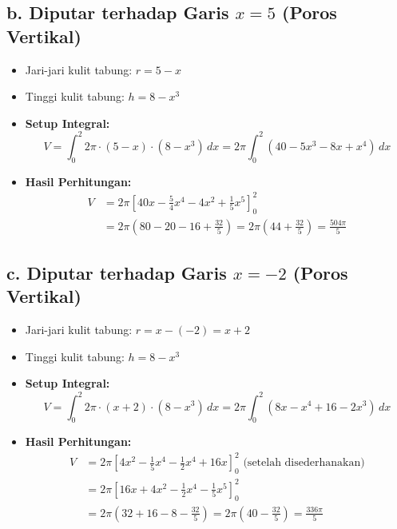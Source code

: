 \documentclass[12pt,a4paper]{article}
\begin{document}
\subsection*{b. Diputar terhadap Garis $x = 5$ (Poros Vertikal)}
\begin{itemize}
  \item Jari-jari kulit tabung: $r = 5 - x$
  \item Tinggi kulit tabung: $h = 8 - x^3$
  \item \textbf{Setup Integral:}
    \begin{equation*}
      V = \int_{0}^{2} 2\pi \cdot (5 - x) \cdot (8 - x^3) \, dx = 2\pi \int_{0}^{2} (40 - 5x^3 - 8x + x^4) \, dx
    \end{equation*}
  \item \textbf{Hasil Perhitungan:}
    \begin{align*}
      V &= 2\pi \left[ 40x - \frac{5}{4}x^4 - 4x^2 + \frac{1}{5}x^5 \right]_{0}^{2} \\
      &= 2\pi \left( 80 - 20 - 16 + \frac{32}{5} \right) = 2\pi \left( 44 + \frac{32}{5} \right) = \frac{504\pi}{5}
    \end{align*}
\end{itemize}

\subsection*{c. Diputar terhadap Garis $x = -2$ (Poros Vertikal)}
\begin{itemize}
  \item Jari-jari kulit tabung: $r = x - (-2) = x + 2$
  \item Tinggi kulit tabung: $h = 8 - x^3$
  \item \textbf{Setup Integral:}
    \begin{equation*}
      V = \int_{0}^{2} 2\pi \cdot (x + 2) \cdot (8 - x^3) \, dx = 2\pi \int_{0}^{2} (8x - x^4 + 16 - 2x^3) \, dx
    \end{equation*}
  \item \textbf{Hasil Perhitungan:}
    \begin{align*}
      V &= 2\pi \left[ 4x^2 - \frac{1}{5}x^4 - \frac{1}{2}x^4 + 16x \right]_{0}^{2} \text{ (setelah disederhanakan)} \\
      &= 2\pi \left[ 16x + 4x^2 - \frac{1}{2}x^4 - \frac{1}{5}x^5 \right]_{0}^{2} \\
      &= 2\pi \left( 32 + 16 - 8 - \frac{32}{5} \right) = 2\pi \left( 40 - \frac{32}{5} \right) = \frac{336\pi}{5}
    \end{align*}
\end{itemize}
\end{document}
